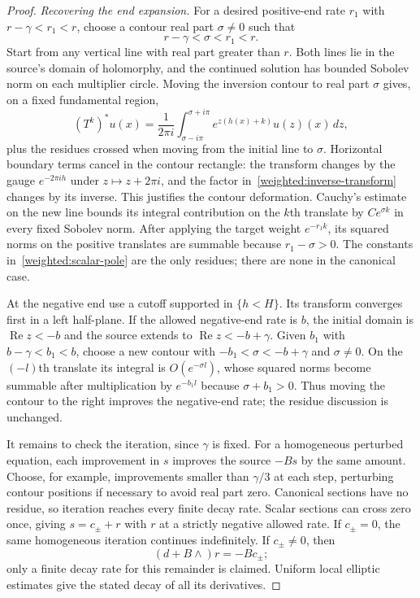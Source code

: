 \begin{proof}
\emph{Recovering the end expansion.}
For a desired positive-end rate $r_1$ with $r-\gamma<r_1<r$, choose
a contour real part $\sigma\ne0$ such that
\[
 r-\gamma<\sigma<r_1<r.
\]
Start from any vertical line with real part greater than $r$.
Both lines lie in the source's domain of holomorphy, and the continued
solution has bounded Sobolev norm on each multiplier circle.
Moving the inversion contour to real part $\sigma$ gives, on a fixed
fundamental region,
\begin{equation}\label{weighted:inverse-transform}
 (T^k)^*u(x)=\frac1{2\pi i}
 \int_{\sigma-i\pi}^{\sigma+i\pi}
     e^{z(h(x)+k)}\widehat u(z)(x)\,dz,
\end{equation}
plus the residues crossed when moving from the initial line to $\sigma$.
Horizontal boundary terms cancel in the contour rectangle: the
transform changes by the gauge $e^{-2\pi i h}$ under $z\mapsto z+2\pi i$,
and the factor in~\eqref{weighted:inverse-transform} changes by its
inverse. This justifies the contour deformation. Cauchy's estimate on
the new line bounds its integral contribution on the $k$th translate
by $Ce^{\sigma k}$ in every fixed Sobolev norm. After applying the
target weight $e^{-r_1 k}$, its squared norms on the positive translates
are summable because
$r_1-\sigma>0$. The constants in~\eqref{weighted:scalar-pole} are the only
residues; there are none in the canonical case.

At the negative end use a cutoff supported in $\{h<H\}$. Its transform
converges first in a left half-plane. If the allowed negative-end rate
is $b$, the initial domain is $\operatorname{Re}z<-b$ and the source
extends to $\operatorname{Re}z<-b+\gamma$. Given $b_1$ with
$b-\gamma<b_1<b$, choose a new contour with
$-b_1<\sigma<-b+\gamma$ and $\sigma\ne0$. On the $(-l)$th translate
its integral is $O(e^{-\sigma l})$, whose squared norms become
summable after multiplication by $e^{-b_1l}$ because
$\sigma+b_1>0$. Thus moving the contour to the right improves the
negative-end rate; the residue discussion is unchanged.

It remains to check the iteration, since $\gamma$ is fixed. For a
homogeneous perturbed equation, each improvement in $s$ improves the
source $-Bs$ by the same amount. Choose, for example, improvements
smaller than $\gamma/3$ at each step, perturbing contour positions if
necessary to avoid real part zero. Canonical sections have no residue,
so iteration reaches every finite decay rate. Scalar sections can
cross zero once, giving $s=c_\pm+r$ with $r$ at a strictly negative
allowed rate. If $c_\pm=0$, the same homogeneous iteration continues
indefinitely. If $c_\pm\ne0$, then
\[
 (d+B\wedge)r=-B c_\pm;
\]
only a finite decay rate for this remainder is claimed. Uniform local
elliptic estimates give the stated decay of all its derivatives.
\end{proof}

